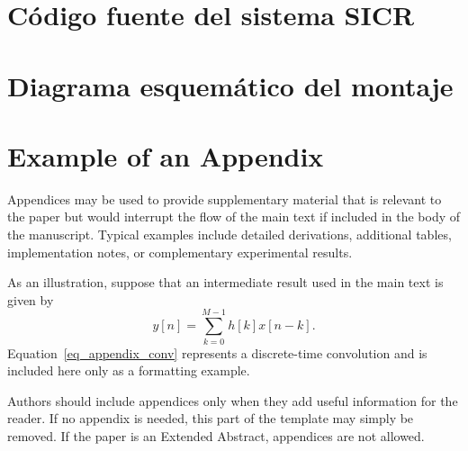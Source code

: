 \section{Código fuente del sistema SICR}
\lipsum[1-4]

\ifx\estilo\apa
	\newpage
\fi

\section{Diagrama esquemático del montaje}
\lipsum[5-7]

\ifx\estilo\apa
	\newpage
\fi

\section{Example of an Appendix}
Appendices may be used to provide supplementary material that is relevant to the paper but would interrupt the flow of the main text if included in the body of the manuscript. Typical examples include detailed derivations, additional tables, implementation notes, or complementary experimental results.

As an illustration, suppose that an intermediate result used in the main text is given by
\begin{equation}
y[n] = \sum_{k=0}^{M-1} h[k]x[n-k].
\label{eq_appendix_conv}
\end{equation}
Equation~\eqref{eq_appendix_conv} represents a discrete-time convolution and is included here only as a formatting example.

Authors should include appendices only when they add useful information for the reader. If no appendix is needed, this part of the template may simply be removed. If the paper is an Extended Abstract, appendices are not allowed.
